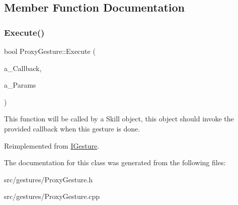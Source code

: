\subsection{Member Function Documentation}
\mbox{\label{class_proxy_gesture_a771b299c01bfaac71566e0c42353f3bf}} 
\subsubsection{\texorpdfstring{Execute()}{Execute()}}
{\footnotesize\ttfamily bool Proxy\+Gesture\+::\+Execute (\begin{DoxyParamCaption}\item[{Gesture\+Delegate}]{a\+\_\+\+Callback,  }\item[{const \hyperlink{class_params_map}{Params\+Map} \&}]{a\+\_\+\+Params }\end{DoxyParamCaption})\hspace{0.3cm}{\ttfamily [virtual]}}

This function will be called by a Skill object, this object should invoke the provided callback when this gesture is done. 

Reimplemented from \hyperlink{class_i_gesture_aa48e38eda852843cab78c22dabfe7371}{I\+Gesture}.



The documentation for this class was generated from the following files\+:\begin{DoxyCompactItemize}
\item 
src/gestures/Proxy\+Gesture.\+h\item 
src/gestures/Proxy\+Gesture.\+cpp\end{DoxyCompactItemize}
